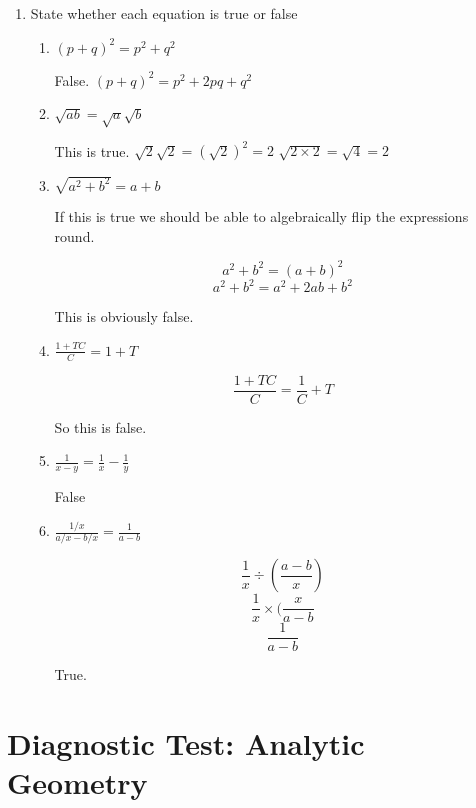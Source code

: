 \documentclass{article}
\begin{document}
\begin{enumerate}
	\item State whether each equation is true or false

	\begin{enumerate}

		\item $(p + q)^2 = p^2 + q^2$
		
			False. $(p + q)^2 = p^2 + 2pq + q^2$

		\item $\sqrt{ab} = \sqrt{a}\sqrt{b}$

			This is true.
			$\sqrt{2}\sqrt{2} = (\sqrt{2})^2 = 2$
			$\sqrt{2\times2} = \sqrt{4} = 2$

		\item $\sqrt{a^2 + b^2} = a +  b$

			If this is true we should be able to algebraically flip the expressions round.

			$$a^2 + b^2 = (a + b)^2$$
			$$a^2 + b^2 = a^2 + 2ab + b^2$$

			This is obviously false.

		\item $\frac{1 + TC}{C} = 1 + T$

			$$\frac{1 + TC}{C} = \frac{1}{C} + T$$

			So this is false.

		\item $\frac{1}{x - y} = \frac{1}{x} - \frac{1}{y}$

			False

		\item $\frac{1/x}{a/x - b/x} = \frac{1}{a-b}$

			$$\frac{1}{x} \div (\frac{a - b}{x})$$
			$$\frac{1}{x} \times (\frac{x}{a-b}$$
			$$\frac{1}{a-b}$$

			True.
	\end{enumerate}

\end{enumerate}

\newpage

\section{Diagnostic Test: Analytic Geometry}
\end{document}
